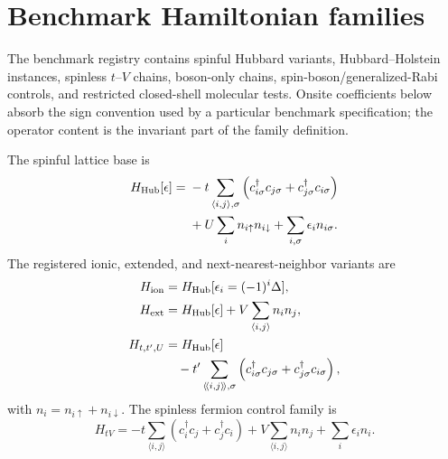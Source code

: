 \documentclass[
  reprint,
  amsmath,
  amssymb,
  aps,
  pra,
  nofootinbib,
  superscriptaddress,
  floatfix
]{revtex4-2}
\begin{document}
\appendix

\section{Benchmark Hamiltonian families}
\label{app:hamiltonian_families}

The benchmark registry contains spinful Hubbard variants, Hubbard--Holstein instances, spinless $t$--$V$ chains, boson-only chains, spin-boson/generalized-Rabi controls, and restricted closed-shell molecular tests. Onsite coefficients below absorb the sign convention used by a particular benchmark specification; the operator content is the invariant part of the family definition.

The spinful lattice base is
\begin{align}
H_{\rm Hub}[\epsilon]={}&
-t\sum_{\langle i,j\rangle,\sigma}
\left(c_{i\sigma}^{\dagger}c_{j\sigma}
+c_{j\sigma}^{\dagger}c_{i\sigma}\right)
\nonumber\\
&
+U\sum_i n_{i\uparrow}n_{i\downarrow}
+\sum_{i,\sigma}\epsilon_i n_{i\sigma}.
\label{eq:app_hubbard}
\end{align}
The registered ionic, extended, and next-nearest-neighbor variants are
\begin{align}
H_{\rm ion}&=H_{\rm Hub}[\epsilon_i=(-1)^i\Delta],
\nonumber\\
H_{\rm ext}&=H_{\rm Hub}[\epsilon]+V\sum_{\langle i,j\rangle} n_i n_j,
\nonumber\\
H_{t,t',U}&=H_{\rm Hub}[\epsilon]
\nonumber\\
&\quad
-t'\sum_{\langle\!\langle i,j\rangle\!\rangle,\sigma}
\left(c_{i\sigma}^{\dagger}c_{j\sigma}
+c_{j\sigma}^{\dagger}c_{i\sigma}\right),
\label{eq:app_hubbard_variants}
\end{align}
with $n_i=n_{i\uparrow}+n_{i\downarrow}$. The spinless fermion control family is
\begin{equation}
H_{tV}=
-t\sum_{\langle i,j\rangle}
\left(c_i^\dagger c_j+c_j^\dagger c_i\right)
+V\sum_{\langle i,j\rangle}n_i n_j
+\sum_i\epsilon_i n_i .
\label{eq:app_spinless_tv}
\end{equation}
\end{document}
